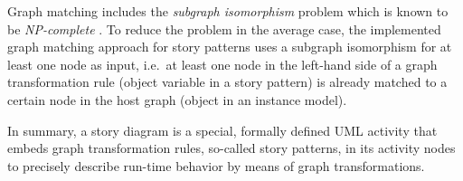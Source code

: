 Graph matching includes the \emph{subgraph isomorphism} problem which is known to be \emph{NP-complete} \cite{Epp95}.
To reduce the problem in the average case, the implemented graph matching approach for story patterns
uses a subgraph isomorphism for at least one node as input,
i.e.\ at least one node in the left-hand side of a graph transformation rule (object variable in a story pattern)
is already matched to a certain node in the host graph (object in an instance model).

In summary, a story diagram is a special, formally defined UML activity
that embeds graph transformation rules, so-called story patterns, in its activity nodes
to precisely describe run-time behavior by means of graph transformations.

